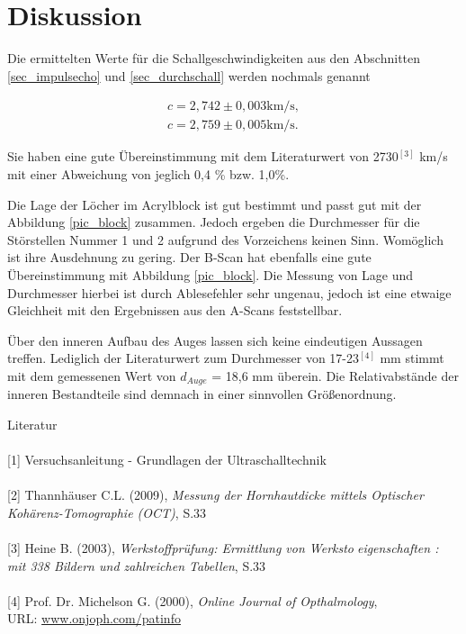 \section{Diskussion}
Die ermittelten Werte für die Schallgeschwindigkeiten aus den Abschnitten \ref{sec_impulsecho} und \ref{sec_durchschall} werden 
nochmals genannt

\begin{align*}
  c = 2,742\pm0,003 \text{km/s},\\
  c = 2,759\pm0,005 \text{km/s}.
\end{align*}

Sie haben eine gute Übereinstimmung mit dem Literaturwert von 2730$^{[3]}$ km/s mit einer Abweichung von jeglich 0,4 \% bzw. 1,0\%. 

Die Lage der Löcher im Acrylblock ist gut bestimmt und passt gut mit der Abbildung \ref{pic_block} zusammen. Jedoch ergeben die Durchmesser
für die Störstellen Nummer 1 und 2 aufgrund des Vorzeichens keinen Sinn. Womöglich ist ihre Ausdehnung zu gering. Der B-Scan hat 
ebenfalls eine gute Übereinstimmung mit Abbildung \ref{pic_block}. Die Messung von Lage und Durchmesser hierbei ist durch Ablesefehler
sehr ungenau, jedoch ist eine etwaige Gleichheit mit den Ergebnissen aus den A-Scans feststellbar.

Über den inneren Aufbau des Auges lassen sich keine eindeutigen Aussagen treffen. Lediglich der Literaturwert zum Durchmesser von 
17-23$^{[4]}$ mm stimmt mit dem gemessenen Wert von $d_{Auge}$ = 18,6 mm überein. Die Relativabstände der inneren Bestandteile sind demnach
in einer sinnvollen Größenordnung.



\parskip 250pt
\Large{Literatur}\\\\
\large{[1] Versuchsanleitung - Grundlagen der Ultraschalltechnik}\\\\
\large{[2] Thannhäuser C.L. (2009), \textit{Messung der Hornhautdicke mittels Optischer Kohärenz-Tomographie (OCT)}, S.33}\\\\
\large{[3] Heine B. (2003), \textit{Werkstoffprüfung: Ermittlung von Werkstoeigenschaften : mit 338 Bildern und zahlreichen Tabellen}, S.33}\\\\
\large{[4] Prof. Dr. Michelson G. (2000), \textit{Online Journal of Opthalmology}, \\URL: \href{http://www.onjoph.com/patinfo/funktion/zahlen.html}{www.onjoph.com/patinfo}}





